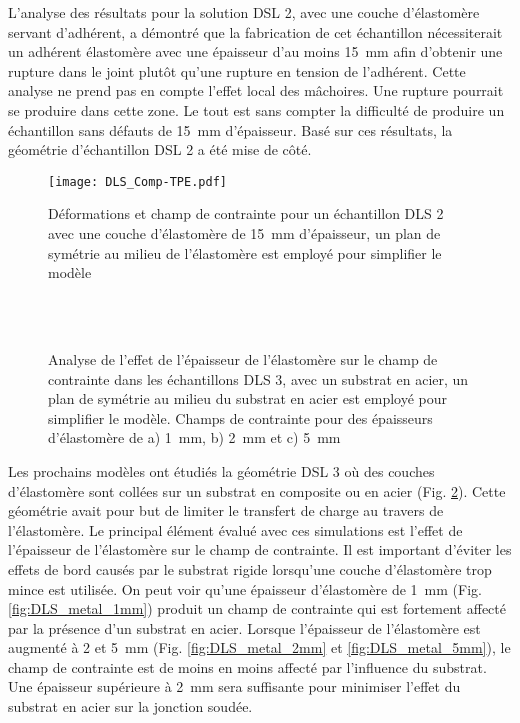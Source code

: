 L'analyse des résultats pour la solution DSL 2, avec une couche d'élastomère servant d'adhérent, a démontré que la fabrication de cet échantillon nécessiterait un adhérent élastomère avec une épaisseur d'au moins \SI[locale=FR]{15}{\milli\metre} afin d'obtenir une rupture dans le joint plutôt qu'une rupture en tension de l'adhérent. 
Cette analyse ne prend pas en compte l'effet local des mâchoires. 
Une rupture pourrait se produire dans cette zone. 
Le tout est sans compter la difficulté de produire un échantillon sans défauts de \SI[locale=FR]{15}{\milli\metre} d'épaisseur. 
Basé sur ces résultats, la géométrie d'échantillon DSL 2 a été mise de côté.

\begin{figure}[h]
	\centering
	\texttt{[image: DLS\_Comp-TPE.pdf]}
	\caption{Déformations et champ de contrainte pour un échantillon DLS 2 avec une couche d'élastomère de \SI[locale=FR]{15}{\milli\metre} d'épaisseur, un plan de symétrie au milieu de l'élastomère est employé pour simplifier le modèle}
	\label{fig:DLS_comp_TPE}
\end{figure}

\begin{figure}[h!]
	\centering
	 \\
	 \\
	\caption{Analyse de l'effet de l'épaisseur de l'élastomère sur le champ de contrainte dans les échantillons DLS 3, avec un substrat en acier, un plan de symétrie au milieu du substrat en acier est employé pour simplifier le modèle. Champs de contrainte pour des épaisseurs d'élastomère de a) \SI{1}{\milli\metre}, b) \SI{2}{\milli\metre} et c) \SI{5}{\milli\metre}}
	\label{fig:DLS_metal}
\end{figure}

Les prochains modèles ont étudiés la géométrie DSL 3 où des couches d'élastomère sont collées sur un substrat en composite ou en acier (Fig. \ref{fig:DLS_metal}). 
Cette géométrie avait pour but de limiter le transfert de charge au travers de l'élastomère. 
Le principal élément évalué avec ces simulations est l'effet de l'épaisseur de l'élastomère sur le champ de contrainte. 
Il est important d'éviter les effets de bord causés par le substrat rigide lorsqu'une couche d'élastomère trop mince est utilisée. 
On peut voir qu'une épaisseur d'élastomère de \SI[locale=FR]{1}{\milli\metre} (Fig. \ref{fig:DLS_metal_1mm}) produit un champ de contrainte qui est fortement affecté par la présence d'un substrat en acier. 
Lorsque l'épaisseur de l'élastomère est augmenté à 2 et \SI[locale=FR]{5}{\milli\metre} (Fig. \ref{fig:DLS_metal_2mm} et \ref{fig:DLS_metal_5mm}), le champ de contrainte est de moins en moins affecté par l'influence du substrat. 
Une épaisseur supérieure à \SI[locale=FR]{2}{\milli\metre} sera suffisante pour minimiser l'effet du substrat en acier sur la jonction soudée. 

